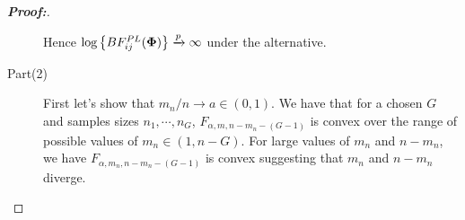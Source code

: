 \documentclass[times,sort&compress,3p]{elsarticle}
\theoremstyle{plain}%
\theoremstyle{definition}
\def\log{\hbox{log}}
\def\log{\hbox{log}}
\def\bse{\begin{eqnarray*}}
\def\ese{\end{eqnarray*}}
\def\be{\begin{eqnarray}}
\def\ee{\end{eqnarray}}
\newcommand{\umu}               {\mbox{\boldmath$\mu$}}
\newcommand{\uPhi}              {\mbox{\boldmath$\Phi$}}
\begin{document}
\begin{proof}[\textbf{\upshape Proof:}]
\begin{description}
Hence $\log\left\{BF^{PL}_{ij}(\uPhi) \right \} \xrightarrow[]{p} \infty$ under the alternative. 

\item[Part(2)] First let's show that $m_n/n \rightarrow a \in (0, 1)$. 
We have that for a chosen $G$ and samples sizes $n_1, \cdots, n_{G}$,  $F_{\alpha, m, n-m_n-(G-1)}$ is convex over the range of possible values of $m_n \in (1, n-G)$. For large values of $m_n$ and $n - m_n$, we have $F_{\alpha, m_n, n-m_n-(G-1)}$ is convex suggesting that $m_n$ and $n-m_n$ diverge. 



\end{description}
\end{proof}
\end{document}
